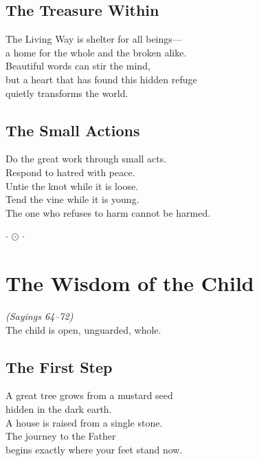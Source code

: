 \documentclass[10pt, openright]{book}
\newcommand{\ornament}{
    \vspace{1.5cm}
    \begin{center}
        \large $\cdot$ $\odot$ $\cdot$
    \end{center}
    \vspace{1.5cm}
}
\begin{document}
\section{The Treasure Within}
The Living Way is shelter for all beings--- \\
a home for the whole and the broken alike. \\

Beautiful words can stir the mind, \\
but a heart that has found this hidden refuge \\
quietly transforms the world.

\section{The Small Actions}
Do the great work through small acts. \\
Respond to hatred with peace. \\
Untie the knot while it is loose. \\
Tend the vine while it is young. \\

The one who refuses to harm cannot be harmed.

\ornament

\chapter{The Wisdom of the Child}
\begin{center}
    \textit{(Sayings 64--72)} \\
    \vspace{0.5cm}
    \small The child is open, unguarded, whole.
\end{center}
\vspace{0.5cm}

\section{The First Step}
A great tree grows from a mustard seed \\
hidden in the dark earth. \\
A house is raised from a single stone. \\
The journey to the Father \\
begins exactly where your feet stand now. \\
\end{document}
